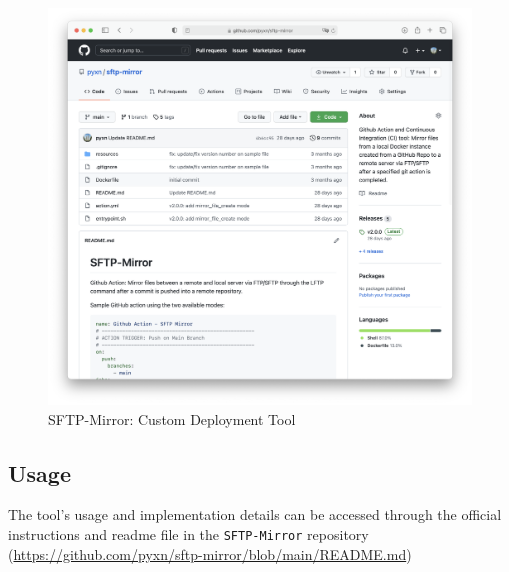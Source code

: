 \documentclass[12pt, letterpaper]{article}
\begin{document}
\begin{figure}[htbp]
	\centering
	\includegraphics[width=\textwidth]{images/25-sftp-mirror.png}
	\caption{SFTP-Mirror: Custom Deployment Tool}
 \end{figure}

\newpage
\subsection*{Usage}
The tool's usage and implementation details can be accessed through the official instructions and readme file in the \lstinline{SFTP-Mirror} repository (\url{https://github.com/pyxn/sftp-mirror/blob/main/README.md})
\end{document}
